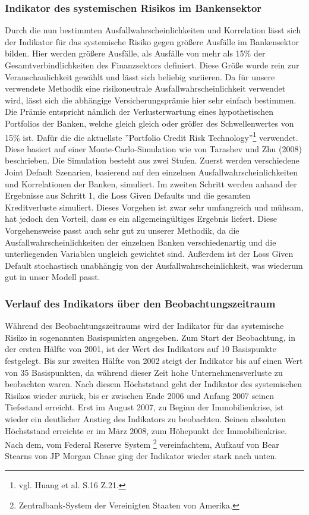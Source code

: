 \documentclass[a4paper,12pt]{scrartcl}
\begin{document}
\subsubsection{Indikator des systemischen Risikos im Bankensektor}
Durch die nun bestimmten Ausfallwahrscheinlichkeiten und Korrelation lässt sich der Indikator für das systemische Risiko gegen größere Ausfälle im Bankensektor bilden. Hier werden größere Ausfälle, als Ausfälle von mehr als 15\% der Gesamtverbindlichkeiten des Finanzsektors definiert. Diese Größe wurde rein zur Veranschaulichkeit gewählt und lässt sich beliebig variieren. 
Da für unsere verwendete Methodik eine risikoneutrale Ausfallwahrscheinlichkeit verwendet wird, lässt sich die abhängige Versicherungsprämie hier sehr einfach bestimmen. Die Prämie entspricht nämlich der Verlusterwartung eines hypothetischen Portfolios der Banken, welche gleich gleich oder größer des Schwellenwertes von 15\% ist. Dafür die die aktuellste ''Portfolio Credit Risk Technology''\footnote{vgl. Huang et al. S.16 Z.21.} verwendet. Diese basiert auf einer Monte-Carlo-Simulation wie von Tarashev und Zhu (2008) beschrieben. 
Die Simulation besteht aus zwei Stufen. Zuerst werden verschiedene Joint Default Szenarien, basierend auf den einzelnen Ausfallwahrscheinlichkeiten und Korrelationen der Banken, simuliert. Im zweiten Schritt werden anhand der Ergebnisse aus Schritt 1, die Loss Given Defaults und die gesamten Kreditverluste simuliert. 
Dieses Vorgehen ist zwar sehr umfangreich und mühsam, hat jedoch den Vorteil, dass es ein allgemeingültiges Ergebnis liefert.
Diese Vorgehensweise passt auch sehr gut zu unserer Methodik, da die Ausfallwahrscheinlichkeiten der einzelnen Banken verschiedenartig und die unterliegenden Variablen ungleich gewichtet sind. Außerdem ist der Loss Given Default stochastisch unabhängig von der Ausfallwahrscheinlichkeit, was wiederum gut in unser Modell passt. 

\subsubsection{Verlauf des Indikators über den Beobachtungszeitraum}
Während des Beobachtungszeitraums wird der Indikator für das systemische Risiko in sogenannten Basispunkten angegeben. Zum Start der Beobachtung, in der ersten Hälfte von 2001, ist der Wert des Indikators auf 10 Basispunkte festgelegt. Bis zur zweiten Hälfte von 2002 steigt der Indikator bis auf einen Wert von 35 Basispunkten, da während dieser Zeit hohe Unternehmensverluste zu beobachten waren. Nach diesem Höchststand geht der Indikator des systemischen Risikos wieder zurück, bis er zwischen Ende 2006 und Anfang 2007 seinen Tiefsstand erreicht. Erst im August 2007, zu Beginn der Immobilienkrise, ist wieder ein deutlicher Anstieg des Indikators zu beobachten. Seinen absoluten Höchststand erreichte er im März 2008, zum Höhepunkt der Immobilienkrise. Nach dem, vom Federal Reserve System \footnote{Zentralbank-System der Vereinigten Staaten von Amerika.} vereinfachtem, Aufkauf von Bear Stearns von JP Morgan Chase ging der Indikator wieder stark nach unten.
\end{document}
